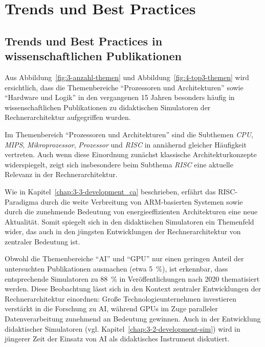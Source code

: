 \section{Trends und Best Practices}


\subsection{Trends und Best Practices in wissenschaftlichen Publikationen}

Aus Abbildung~\ref{fig:3-anzahl-themen} und Abbildung~\ref{fig:4-top3-themen} wird ersichtlich, dass die Themenbereiche \enquote{Prozessoren und Architekturen} sowie \enquote{Hardware und Logik} in den vergangenen 15 Jahren besonders häufig in wissenschaftlichen Publikationen zu didaktischen Simulatoren der Rechnerarchitektur aufgegriffen wurden.  

Im Themenbereich \enquote{Prozessoren und Architekturen} sind die Subthemen \textit{CPU}, \textit{MIPS}, \textit{Mikroprozessor}, \textit{Prozessor} und \textit{RISC} in annähernd gleicher Häufigkeit vertreten. Auch wenn diese Einordnung zunächst klassische Architekturkonzepte widerspiegelt, zeigt sich insbesondere beim Subthema \textit{RISC} eine aktuelle Relevanz in der Rechnerarchitektur.  

Wie in Kapitel~\ref{chap:3-3-development_ca} beschrieben, erfährt das \ac{RISC}-Paradigma durch die weite Verbreitung von ARM-basierten Systemen sowie durch die zunehmende Bedeutung von energieeffizienten Architekturen eine neue Aktualität. Somit spiegelt sich in den didaktischen Simulatoren ein Themenfeld wider, das auch in den jüngsten Entwicklungen der Rechnerarchitektur von zentraler Bedeutung ist.


Obwohl die Themenbereiche \enquote{AI} und \enquote{GPU} nur einen geringen Anteil der untersuchten Publikationen ausmachen (etwa 5~\%), ist erkennbar, dass entsprechende Simulatoren zu 88~\% in Veröffentlichungen nach 2020 thematisiert werden. Diese Beobachtung lässt sich in den Kontext zentraler Entwicklungen der Rechnerarchitektur einordnen: Große Technologieunternehmen investieren verstärkt in die Forschung zu \ac{AI}, während GPUs im Zuge paralleler Datenverarbeitung zunehmend an Bedeutung gewinnen. Auch in der Entwicklung didaktischer Simulatoren (vgl. Kapitel~\ref{chap:3-2-development-sim}) wird in jüngerer Zeit der Einsatz von \ac{AI} als didaktisches Instrument diskutiert.


